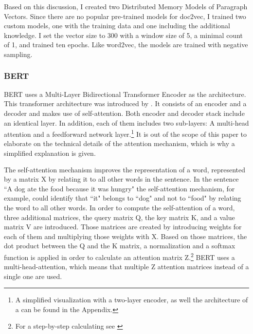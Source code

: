 \documentclass[12pt, a4paper, titlepage]{article}
\begin{document}
Based on this discussion, I created two Distributed Memory Models of Paragraph Vectors. Since there are no popular pre-trained models for doc2vec, I trained two custom models, one with the training data and one including the additional knowledge. I set the vector size to 300 with a window size of 5, a minimal count of 1, and trained ten epochs. Like word2vec, the models are trained with negative sampling. 

\subsubsection*{BERT}
\ac{BERT} uses a Multi-Layer Bidirectional Transformer Encoder as the architecture. This transformer architecture was introduced by \citet{vaswani2017}. It consists of an encoder and a decoder and makes use of self-attention. Both encoder and decoder stack include an identical layer. In addition, each of them includes two sub-layers: A multi-head attention and a feedforward network layer.\footnote{A simplified visualization with a two-layer encoder, as well the architecture of a can be found in the Appendix.} It is out of the scope of this paper to elaborate on the technical details of the attention mechanism, which is why a simplified explanation is given. 

The self-attention mechanism improves the representation of a word, represented by a matrix X by relating it to all other words in the sentence. In the sentence ``A dog ate the food because it was hungry" \citep[10]{ravichandiran2021} the self-attention mechanism, for example, could identify that ``it" belongs to ``dog" and not to ``food" by relating the word to all other words. In order to compute the self-attention of a word, three additional matrices, the query matrix Q, the key matrix K, and a value matrix V are introduced. Those matrices are created by introducing weights for each of them and multiplying those weights with X. Based on those matrices, the dot product between the Q and the K matrix, a normalization and a softmax function is applied in order to calculate an attention matrix Z.\footnote{For a step-by-step calculating see \citep{ravichandiran2021}} \ac{BERT} uses a multi-head-attention, which means that multiple Z attention matrices instead of a single one are used.
\end{document}
